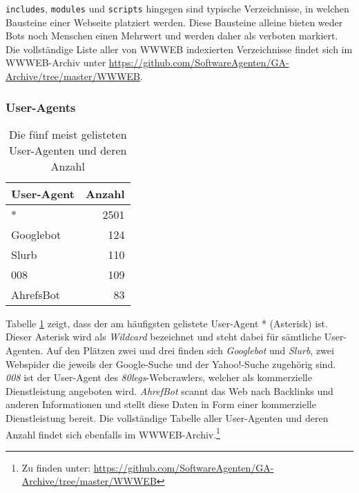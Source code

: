 \texttt{includes}, \texttt{modules} und \texttt{scripts} hingegen sind typische
Verzeichnisse, in welchen Bausteine einer Webseite platziert werden. Diese
Bausteine alleine bieten weder Bots noch Menschen einen Mehrwert und werden
daher als verboten markiert. Die vollständige Liste aller von WWWEB indexierten
Verzeichnisse findet sich im WWWEB-Archiv unter \url{https://github.com/SoftwareAgenten/GA-Archive/tree/master/WWWEB}.

\subsubsection{User-Agents}
\label{ssub:user-agents}

\begin{table}[h]
  \begin{tabular}{ l|r }
    \textbf{User-Agent} & \textbf{Anzahl}\\
    \hline
    *         & 2501 \\
    Googlebot & 124  \\
    Slurb     & 110  \\
    008       & 109  \\
    AhrefsBot & 83   \\
  \end{tabular}
  
  \caption{Die fünf meist gelisteten User-Agenten und deren Anzahl}
  \label{tab:maxUA}
\end{table}

Tabelle \ref{tab:maxUA} zeigt, dass der am häufigsten gelistete User-Agent *
(Asterisk) ist. Dieser Asterisk wird als \emph{Wildcard} bezeichnet und steht
dabei für sämtliche User-Agenten. Auf den Plätzen zwei und drei finden sich
\emph{Googlebot} und \emph{Slurb}, zwei Webspider die
jeweils der Google-Suche und der Yahoo!-Suche zugehörig sind. \emph{008} ist
der User-Agent des \emph{80legs}-Webcrawlers, welcher als kommerzielle
Dienstleistung angeboten wird. \emph{AhrefBot} scannt das Web nach Backlinks
und anderen Informationen und stellt diese Daten in Form einer kommerzielle
Dienstleistung bereit. Die vollständige Tabelle aller User-Agenten und deren
Anzahl findet sich ebenfalls im WWWEB-Archiv.\footnote{Zu finden unter:
\url{https://github.com/SoftwareAgenten/GA-Archive/tree/master/WWWEB}}
